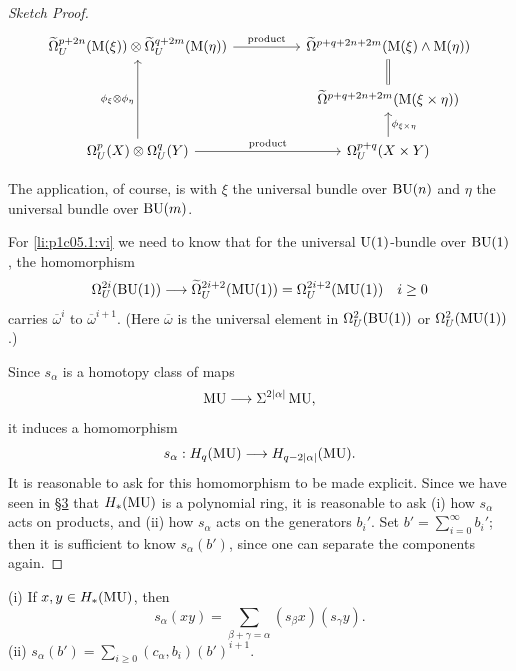 \documentclass[../main]{subfiles}
\begin{document}
\begin{proof}[Sketch Proof]
\begin{equation*}
\begin{tikzcd}
{\tilde \Omega}_U^{p + 2n}(\te{M}(\xi)) \otimes {\tilde \Omega}_U^{q + 2m}(\te{M}(\eta)) \arrow[rr, "\mathrm{product}"] &  & {\tilde \Omega}^{p + q + 2n + 2m}(\te{M}(\xi) \wedge \te{M}(\eta))                             \\
                                                                                                                      &  & {\tilde \Omega}^{p + q + 2n + 2m}(\te{M}(\xi \times \eta)) \arrow[u, equals] \\
\Omega_U^p(X) \otimes \Omega_U^q(Y) \arrow[rr, "\mathrm{product}"] \arrow[uu, "\phi_\xi \otimes \phi_\eta"]           &  & \Omega_U^{p + q}(X \times Y) \arrow[u, "\phi_{\xi \times \eta}"']                   
\end{tikzcd}
\end{equation*}

The application, of course, is with $\xi$ the universal bundle over $\mathrm{BU}(n)$ and $\eta$ the universal bundle over $\mathrm{BU}(m)$.

For \ref{li:p1c05.1:vi} we need to know that for the universal $\mathrm{U}(1)$-bundle over $\mathrm{BU}(1)$, the homomorphism 
\begin{equation*}
	\Omega_U^{2i}(\mathrm{BU}(1)) \longrightarrow {\widetilde{\Omega}}_U^{2 i + 2}(\mathrm{MU}(1)) = \Omega_U^{2i + 2}(\mathrm{MU}(1)) \quad i \ge 0
\end{equation*} 
carries $\overline \omega^i$ to $\overline \omega^{i + 1}$. (Here $\overline \omega$ is the universal element in $\Omega_U^2(\mathrm{BU}(1))$ or $\Omega_U^2(\mathrm{MU}(1))$.)

Since $s_\alpha$ is a homotopy class of maps 
\begin{equation*}
	\operatorname{MU} \longrightarrow \Sigma^{2\lvert\alpha\rvert} \operatorname{MU},
\end{equation*}
it induces a homomorphism \[s_\alpha : H_q(\operatorname{MU}) \longrightarrow H_{q - 2\lvert\alpha\rvert} (\mathrm {MU}).\] It is reasonable to ask for this homomorphism to be made explicit. Since we have seen in \hyperref[sec:p1c3]{\S 3} that $H_\ast(\operatorname{MU})$ is a polynomial ring, it is reasonable to ask (i) how $s_\alpha$ acts on products, and (ii) how $s_\alpha$ acts on the generators $b_i'$. Set $\displaystyle b' = \sum_{i = 0}^\infty b_i'$; then it is sufficient to know $s_\alpha(b')$, since one can separate the components again.
\end{proof}

\begin{theorem}\label{thm:p1c05.2}
(i) If $x ,y \in H_\ast(\operatorname{MU})$, then \[s_\alpha (xy) = \sum_{\beta + \gamma = \alpha} (s_\beta x) (s_\gamma y).\] 
(ii) $\displaystyle s_\alpha(b') = \sum_{i \ge 0} (c_\alpha, b_i)(b')^{i + 1}.$
\end{theorem}
\end{document}
